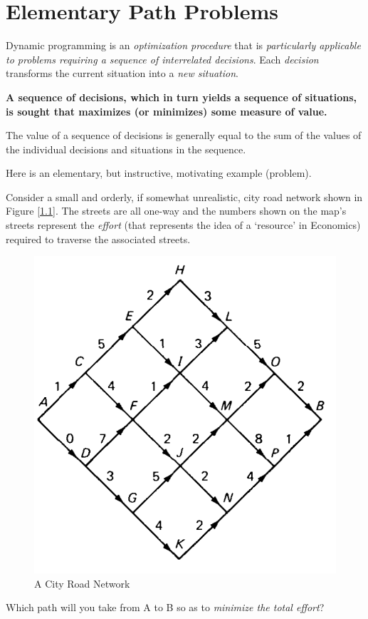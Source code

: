 \documentclass[english,notitlepage,smartquotes]{hgbreport}
\theoremstyle{definition}
\theoremstyle{definition}
\theoremstyle{remark}
\theoremstyle{definition}
\theoremstyle{plain}
\theoremstyle{definition}
\begin{document}
\tableofcontents

\chapter{Elementary Path Problems}

Dynamic programming is an \emph{optimization procedure} that is \emph{particularly applicable to problems requiring a sequence of interrelated decisions}. Each \emph{decision} transforms the current situation into a \emph{new situation}. 

\textbf{A sequence of decisions, which in turn yields a sequence of situations, is sought that maximizes (or minimizes) some measure of value.}

The value of a sequence of decisions is generally equal to the sum of the values of the individual decisions and situations in the sequence.

Here is an elementary, but instructive, motivating example (problem).


Consider a small and orderly, if somewhat unrealistic, city road network shown in Figure [\ref{fig:cityroads}]. The streets are all one-way and the numbers shown on the map's streets represent the \emph{effort} (that represents the idea of a `resource' in Economics) required to traverse the associated streets. 
\begin{figure}[!h]
\begin{center}
\caption{A City Road Network}
\label{fig:cityroads}
\includegraphics[width=.345\textwidth]{elem-path-problem-1}
\end{center}
\end{figure}

Which path will you take from A to B so as to \emph{minimize the total effort}?
\end{document}
